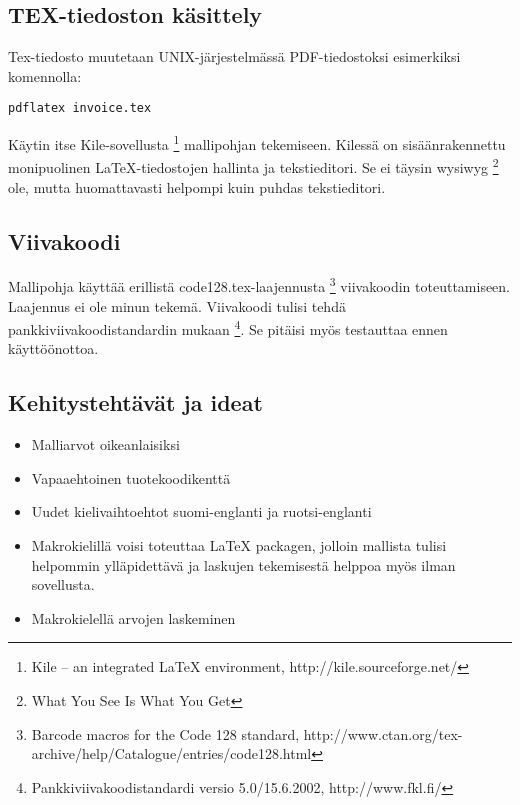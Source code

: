 \documentclass[a4paper,12pt]{article}
\begin{document}
\subsection{TEX-tiedoston käsittely}

Tex-tiedosto muutetaan UNIX-järjestelmässä PDF-tiedostoksi esimerkiksi komennolla:
\begin{verbatim}
pdflatex invoice.tex
\end{verbatim}

Käytin itse Kile-sovellusta \footnote{Kile -- an integrated LaTeX environment, 
http://kile.sourceforge.net/} mallipohjan tekemiseen. Kilessä on sisäänrakennettu 
monipuolinen \LaTeX-tiedostojen hallinta ja tekstieditori. Se ei täysin wysiwyg 
\footnote{What You See Is What You Get} ole, mutta huomattavasti helpompi kuin puhdas tekstieditori.

\subsection{Viivakoodi}

Mallipohja käyttää erillistä code128.tex-laajennusta \footnote{Barcode macros 
for the Code 128 standard, 
http://www.ctan.org/tex-archive/help/Catalogue/entries/code128.html} 
viivakoodin toteuttamiseen. Laajennus ei ole minun tekemä. Viivakoodi tulisi 
tehdä pankkiviivakoodistandardin mukaan \footnote{Pankkiviivakoodistandardi 
versio 5.0/15.6.2002, http://www.fkl.fi/}. Se pitäisi myös testauttaa ennen käyttöönottoa.

\subsection{Kehitystehtävät ja ideat}

\begin{itemize}
 \item Malliarvot oikeanlaisiksi
 \item Vapaaehtoinen tuotekoodikenttä
 \item Uudet kielivaihtoehtot suomi-englanti ja ruotsi-englanti
 \item Makrokielillä voisi toteuttaa \LaTeX{} packagen, jolloin mallista tulisi helpommin ylläpidettävä ja laskujen tekemisestä helppoa myös ilman sovellusta.
 \item Makrokielellä arvojen laskeminen
\end{itemize}
\end{document}

